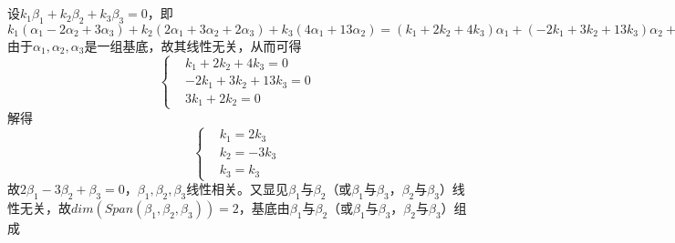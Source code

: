 \documentclass{article}
\begin{document}
\section{
}
设$ k_1\beta_1+k_2\beta_2+k_3\beta_3=0 $，即$ k_1(\alpha_1-2\alpha_2+3\alpha_3)+k_2(2\alpha_1+3\alpha_2+2\alpha_3)+k_3(4\alpha_1+13\alpha_2)=(k_1+2k_2+4k_3)\alpha_1+(-2k_1+3k_2+13k_3)\alpha_2+(3k_1+2k_2)\alpha_3=0  $\\
由于$ \alpha_1,\alpha_2,\alpha_3 $是一组基底，故其线性无关，从而可得
\begin{equation}
		\left\{
	\begin{aligned}
		&k_1+2k_2+4k_3=0\\
		&-2k_1+3k_2+13k_3=0\\
		&3k_1+2k_2=0
	\end{aligned} 
	\right.
\end{equation}
解得
\begin{equation}
	\left\{
	\begin{aligned}
		&k_1=2k_3\\
		&k_2=-3k_3\\
		&k_3=k_3
	\end{aligned} 
	\right.
\end{equation}
故$ 2\beta_1-3\beta_2+\beta_3=0 $，$  \beta_1,\beta_2,\beta_3$线性相关。又显见$ \beta_1 $与$ \beta_2 $（或$ \beta_1 $与$ \beta_3 $，$ \beta_2 $与$ \beta_3 $）线性无关，故$ dim(Span(\beta_1,\beta_2,\beta_3))=2 $，基底由$ \beta_1 $与$ \beta_2 $（或$ \beta_1 $与$ \beta_3 $，$ \beta_2 $与$ \beta_3 $）组成
\end{document}

